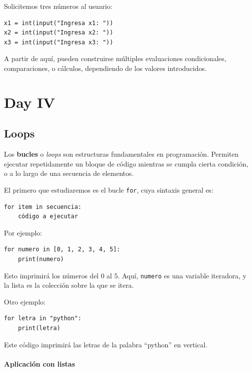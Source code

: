 \documentclass{article}
\theoremstyle{nonumberplain}
\begin{document}
Solicitemos tres números al usuario:

\begin{verbatim}
x1 = int(input("Ingresa x1: "))
x2 = int(input("Ingresa x2: "))
x3 = int(input("Ingresa x3: "))
\end{verbatim}

A partir de aquí, pueden construirse múltiples evaluaciones condicionales, comparaciones, o cálculos, dependiendo de los valores introducidos.



\section*{Day IV}

\subsection*{Loops}

Los \textbf{bucles} o \textit{loops} son estructuras fundamentales en programación. Permiten ejecutar repetidamente un bloque de código mientras se cumpla cierta condición, o a lo largo de una secuencia de elementos.

El primero que estudiaremos es el bucle \texttt{for}, cuya sintaxis general es:

\begin{verbatim}
for item in secuencia:
    código a ejecutar
\end{verbatim}

Por ejemplo:

\begin{verbatim}
for numero in [0, 1, 2, 3, 4, 5]:
    print(numero)
\end{verbatim}

Esto imprimirá los números del 0 al 5. Aquí, \texttt{numero} es una variable iteradora, y la lista es la colección sobre la que se itera.

Otro ejemplo:

\begin{verbatim}
for letra in "python":
    print(letra)
\end{verbatim}

Este código imprimirá las letras de la palabra “python” en vertical.

\paragraph{Aplicación con listas}
\end{document}
